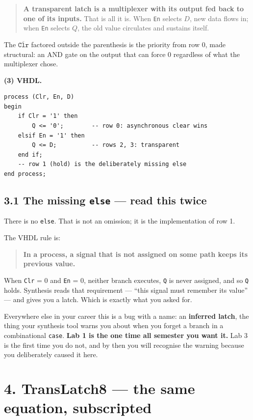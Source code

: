 \documentclass[11pt]{article}
\newcommand{\code}[1]{\texttt{#1}}
\begin{document}
\begin{quote}
\textbf{A transparent latch is a multiplexer with its output fed back to one of its
inputs.} That is all it is. When \code{En} selects $D$, new data flows in; when
\code{En} selects $Q$, the old value circulates and sustains itself.
\end{quote}

The $\overline{\code{Clr}}$ factored outside the parenthesis is the priority from
row 0, made structural: an AND gate on the output that can force 0 regardless of
what the multiplexer chose.

\textbf{(3) VHDL.}
\begin{lstlisting}
process (Clr, En, D)
begin
    if Clr = '1' then
        Q <= '0';        -- row 0: asynchronous clear wins
    elsif En = '1' then
        Q <= D;          -- rows 2, 3: transparent
    end if;
    -- row 1 (hold) is the deliberately missing else
end process;
\end{lstlisting}

\subsection*{3.1 The missing \code{else} --- read this twice}

There is no \code{else}. That is not an omission; it is the implementation of row 1.

The VHDL rule is:
\begin{quote}
\textbf{In a process, a signal that is not assigned on some path keeps its previous
value.}
\end{quote}

When \code{Clr} = 0 and \code{En} = 0, neither branch executes, \code{Q} is never
assigned, and so \code{Q} holds. Synthesis reads that requirement --- ``this signal
must remember its value'' --- and gives you a latch. Which is exactly what you
asked for.

Everywhere else in your career this is a bug with a name: an \textbf{inferred
latch}, the thing your synthesis tool warns you about when you forget a branch in a
combinational \code{case}. \textbf{Lab 1 is the one time all semester you want it.}
Lab 3 is the first time you do not, and by then you will recognise the warning
because you deliberately caused it here.

\section*{4. TransLatch8 --- the same equation, subscripted}
\end{document}

